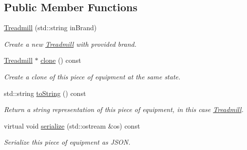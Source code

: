 \subsection*{Public Member Functions}
\begin{DoxyCompactItemize}
\item 
\hypertarget{class_treadmill_a7ec4387dbd384f43b334489d0b11c375}{}\hyperlink{class_treadmill_a7ec4387dbd384f43b334489d0b11c375}{Treadmill} (std\+::string in\+Brand)\label{class_treadmill_a7ec4387dbd384f43b334489d0b11c375}

\begin{DoxyCompactList}\small\item\em Create a new \hyperlink{class_treadmill}{Treadmill} with provided brand. \end{DoxyCompactList}\item 
\hypertarget{class_treadmill_a08f97c25ccacfe75006d15d588ab1a7e}{}\hyperlink{class_treadmill}{Treadmill} $\ast$ \hyperlink{class_treadmill_a08f97c25ccacfe75006d15d588ab1a7e}{clone} () const \label{class_treadmill_a08f97c25ccacfe75006d15d588ab1a7e}

\begin{DoxyCompactList}\small\item\em Create a clone of this piece of equipment at the same state. \end{DoxyCompactList}\item 
\hypertarget{class_treadmill_a3e3bd72be9733d69bb24a403bc8e0adb}{}std\+::string \hyperlink{class_treadmill_a3e3bd72be9733d69bb24a403bc8e0adb}{to\+String} () const \label{class_treadmill_a3e3bd72be9733d69bb24a403bc8e0adb}

\begin{DoxyCompactList}\small\item\em Return a string representation of this piece of equipment, in this case \textquotesingle{}\hyperlink{class_treadmill}{Treadmill}\textquotesingle{}. \end{DoxyCompactList}\item 
\hypertarget{class_treadmill_a81bf5856fe15db5adf3ebf988a815b11}{}virtual void \hyperlink{class_treadmill_a81bf5856fe15db5adf3ebf988a815b11}{serialize} (std\+::ostream \&os) const \label{class_treadmill_a81bf5856fe15db5adf3ebf988a815b11}

\begin{DoxyCompactList}\small\item\em Serialize this piece of equipment as J\+S\+O\+N. \end{DoxyCompactList}\end{DoxyCompactItemize}
